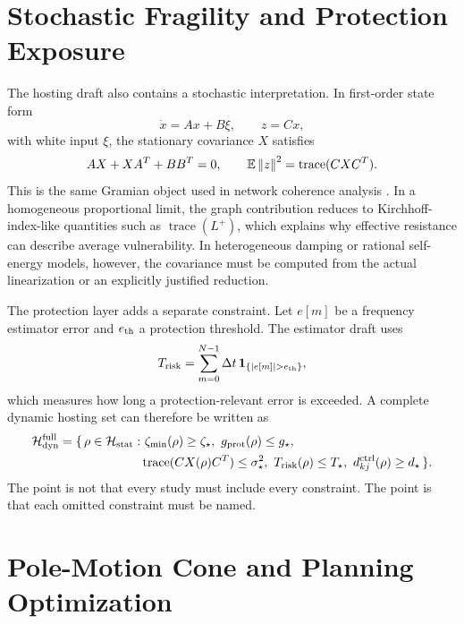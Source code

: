 \section{Stochastic Fragility and Protection Exposure}

The hosting draft also contains a stochastic interpretation. In first-order
state form
\begin{equation}
  \dot x=Ax+B\xi,\qquad z=Cx,
  \label{eq:stochastic_state}
\end{equation}
with white input \(\xi\), the stationary covariance \(X\) satisfies
\begin{equation}
  AX+XA^T+BB^T=0,
  \qquad
  \mathbb E\left\lVert z \right\rVert^2=\operatorname{trace}(CXC^T).
  \label{eq:lyapunov_variance}
\end{equation}
This is the same Gramian object used in network coherence analysis
\cite{bamieh2012coherence,tyloo2018robustness}. In a homogeneous proportional
limit, the graph contribution reduces to Kirchhoff-index-like quantities such
as \(\operatorname{trace}(L^+)\), which explains why effective resistance can
describe average vulnerability. In heterogeneous damping or rational
self-energy models, however, the covariance must be computed from the actual
linearization or an explicitly justified reduction.

The protection layer adds a separate constraint. Let \(e[m]\) be a frequency
estimator error and \(e_{\rm th}\) a protection threshold. The estimator draft
uses
\begin{equation}
  T_{\rm risk}
  =
  \sum_{m=0}^{N-1}\Delta t\,
  \mathbf 1_{\{|e[m]|>e_{\rm th}\}},
  \label{eq:integrated_trip_risk}
\end{equation}
which measures how long a protection-relevant error is exceeded. A complete
dynamic hosting set can therefore be written as
\begin{align}
  \mathcal H_{\rm dyn}^{\rm full}
  =
  \{\,\rho\in\mathcal H_{\rm stat}:&
  \ \zeta_{\min}(\rho)\ge\zeta_\star,\ 
  g_{\rm prot}(\rho)\le g_\star,\nonumber\\
  &
  \operatorname{trace}(C X(\rho) C^T)\le \sigma_\star^2,\ 
  T_{\rm risk}(\rho)\le T_\star,\ 
  d^{\rm ctrl}_{kj}(\rho)\ge d_\star
  \,\}.
  \label{eq:full_dynamic_hosting_set}
\end{align}
The point is not that every study must include every constraint. The point is
that each omitted constraint must be named.

\section{Pole-Motion Cone and Planning Optimization}

